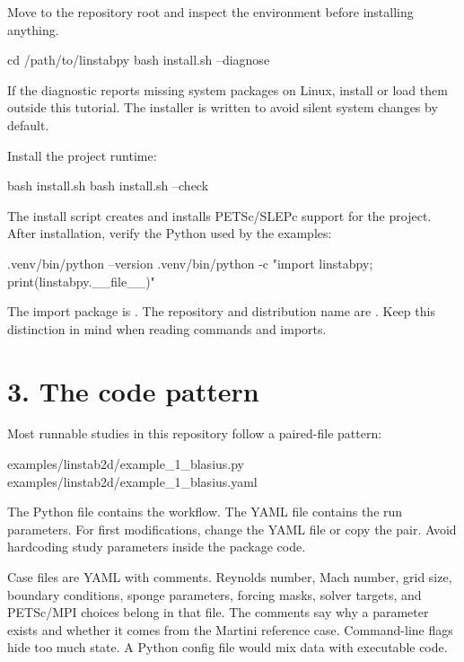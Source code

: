 \documentclass[11pt,a4paper]{article}
\newcommand{\code}[1]{\texttt{\detokenize{#1}}}
\begin{document}
Move to the repository root and inspect the environment before installing anything.

\begin{commandbox}
cd /path/to/linstabpy
bash install.sh --diagnose
\end{commandbox}

If the diagnostic reports missing system packages on Linux, install or load them outside this tutorial. The installer is written to avoid silent system changes by default.

Install the project runtime:

\begin{commandbox}
bash install.sh
bash install.sh --check
\end{commandbox}

The install script creates  and installs PETSc/SLEPc support for the project. After installation, verify the Python used by the examples:

\begin{commandbox}
.venv/bin/python --version
.venv/bin/python -c "import linstabpy; print(linstabpy.__file__)"
\end{commandbox}

\begin{notebox}
The import package is \code{linstabpy}. The repository and distribution name are \code{linstabpy}. Keep this distinction in mind when reading commands and imports.
\end{notebox}

\section*{3. The code pattern}

Most runnable studies in this repository follow a paired-file pattern:

\begin{outputbox}
examples/linstab2d/example_1_blasius.py
examples/linstab2d/example_1_blasius.yaml
\end{outputbox}

The Python file contains the workflow. The YAML file contains the run parameters. For first modifications, change the YAML file or copy the pair. Avoid hardcoding study parameters inside the package code.

\begin{notebox}
Case files are YAML with comments. Reynolds number, Mach number, grid size, boundary conditions, sponge parameters, forcing masks, solver targets, and PETSc/MPI choices belong in that file. The comments say why a parameter exists and whether it comes from the Martini reference case. Command-line flags hide too much state. A Python config file would mix data with executable code.
\end{notebox}
\end{document}
